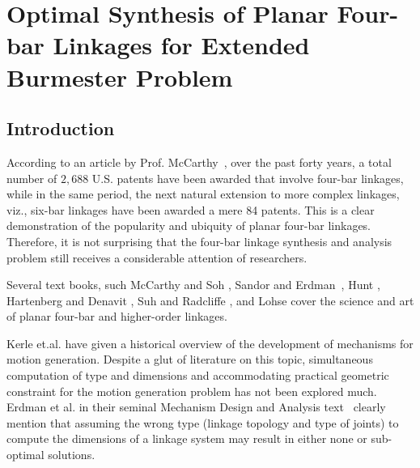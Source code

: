 \chapter{Optimal Synthesis of Planar Four-bar Linkages for Extended Burmester Problem}\label{ExtendedBurmester}

\section{Introduction}
According to an article by Prof. McCarthy~\cite{McCarthy-blog}, over the past forty years, a total number of $2,688$ U.S. patents have been awarded that involve four-bar linkages, while in the same period, the next natural extension to more complex linkages, viz., six-bar linkages have been awarded a mere 84 patents.
This is a clear demonstration of the popularity and ubiquity of planar four-bar linkages. Therefore, it is not surprising that the four-bar linkage synthesis and analysis problem still receives a considerable attention of researchers.

Several text books, such McCarthy and Soh \cite{sohmccarthy}, Sandor and Erdman~\cite{Sandor}, Hunt \cite{Hunt78}, Hartenberg and Denavit \cite{Hartenberg},  Suh and Radcliffe \cite{Suh78}, and Lohse \cite{lohse2013} cover the science and art of planar four-bar and higher-order linkages.

Kerle et.al.\cite{modler2011} have given a historical overview of the development of mechanisms for motion generation.  Despite a glut of literature on this topic, simultaneous computation of type and dimensions and accommodating practical geometric constraint for the motion generation problem has not been explored much.
Erdman et al. in their seminal Mechanism Design and Analysis text~\cite{ErdmanSandor} clearly mention that assuming the wrong type (linkage topology and type of joints) to compute the dimensions of a linkage system may result in either none or sub-optimal solutions.

